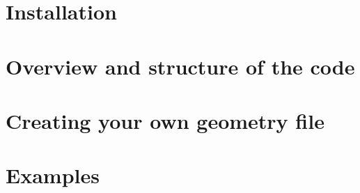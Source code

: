 \documentclass[a4paper,12]{article}
\theoremstyle{definition}
\begin{document}
\section{Installation} \label{sect:install}
 





\section{Overview and structure of the code} \label{sect:overview}

 






\section{Creating your own geometry file}\label{sect.geo}






\section{Examples} \label{sect:examples}







\newpage
%
%
%
%
%
%



\end{document}
